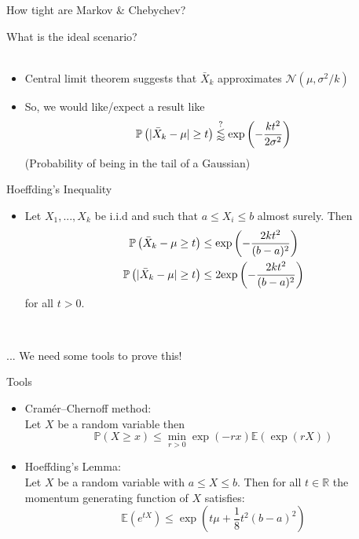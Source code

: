 \documentclass{beamer}
\newcommand{\bitem}{\item[$\bullet$]}
\begin{document}
\begin{frame}{How tight are Markov \& Chebychev?}

What is the ideal scenario?\\
~\\
\begin{itemize}
    \bitem Central limit theorem suggests that $\bar{X}_k$ approximates $\mathcal{N}(\mu, \sigma^2/k)$
    \bitem So, we would like/expect a result like
    $$
    \mathbb{P} \left( |\bar{X}_k - \mu|\geq t \right)
    \overset{?}{\lessapprox}
    {\rm exp}
    \left(
    -\frac{k t^2}{2\sigma^2}
    \right)
    $$
    (Probability of being in the tail of a Gaussian)
\end{itemize}
    
\end{frame}


\begin{frame}{Hoeffding's Inequality}
\begin{itemize}
    \bitem Let $X_1,...,X_k$ be i.i.d and such that $a\leq X_{i}\leq b$ almost surely. Then
    \begin{equation*}
    \begin{aligned}\mathbb{P} \left(
    \bar{X}_k - \mu \geq t
    \right)
    &\leq {\rm exp}\left(
    - \frac{2kt^2}{(b - a)^2}
    \right) \\
    \mathbb{P} \left(
    |\bar{X}_k - \mu| \geq t
    \right)
    &\leq 2 {\rm exp}\left(
    - \frac{2kt^2}{(b - a)^2}
    \right) 
    \end{aligned}
    \end{equation*}
    for all $t>0$.
\end{itemize}
~\\
\begin{center}
... We need some tools to prove this!
\end{center}
\end{frame}


\begin{frame}{Tools}

\begin{itemize}
    \bitem Cram\'er--Chernoff method:\\
    Let $X$ be a random variable then
    $$
    \mathbb{P}(X \geq x)
    \leq \min_{r> 0} \exp(-rx) \mathbb{E} (\exp(rX))
    $$
    \bitem Hoeffding's Lemma:\\
    Let $X$ be a random variable with $a\leq X\leq b$. Then for all $t\in \mathbb{R}$ the momentum generating function of $X$ satisfies:
    $$
    \mathbb{E}(e^{tX})
    \leq \exp\left(
    t\mu +\frac{1}{8}t^2(b-a)^2
    \right)
    $$
\end{itemize}
    
\end{frame}
\end{document}
